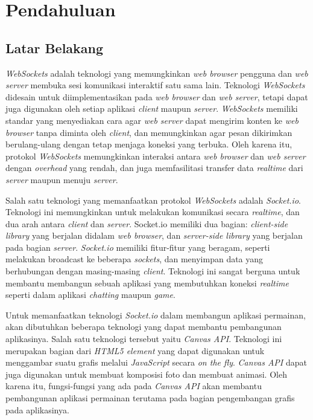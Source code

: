 \chapter{Pendahuluan}
\label{chap:intro}
   
\section{Latar Belakang}
\label{sec:label}

\textit{WebSockets} adalah teknologi yang memungkinkan \textit{web browser} pengguna dan \textit{web server} membuka sesi komunikasi interaktif satu sama lain. Teknologi \textit{WebSockets}  didesain untuk diimplementasikan pada \textit{web browser} dan \textit{web server}, tetapi dapat juga digunakan oleh setiap aplikasi \textit{client} maupun \textit{server}. \textit{WebSockets} memiliki standar yang menyediakan cara agar \textit{web server} dapat mengirim konten ke \textit{web browser} tanpa diminta oleh \textit{client}, dan memungkinkan agar pesan dikirimkan berulang-ulang dengan tetap menjaga koneksi yang terbuka. Oleh karena itu, protokol \textit{WebSockets} memungkinkan interaksi antara \textit{web browser} dan \textit{web server} dengan \textit{overhead} yang rendah, dan juga memfasilitasi transfer data \textit{realtime} dari \textit{server} maupun menuju \textit{server}.

Salah satu teknologi yang memanfaatkan protokol \textit{WebSockets} adalah \textit{Socket.io}. Teknologi ini memungkinkan untuk melakukan komunikasi secara \textit{realtime}, dan dua arah antara \textit{client} dan \textit{server}. Socket.io memiliki dua bagian: \textit{client-side library} yang berjalan didalam \textit{web browser}, dan \textit{server-side library} yang berjalan pada bagian \textit{server}. \textit{Socket.io} memiliki fitur-fitur yang beragam, seperti melakukan broadcast ke beberapa \textit{sockets}, dan menyimpan data yang berhubungan dengan masing-masing \textit{client}. Teknologi ini sangat berguna untuk membantu membangun sebuah aplikasi yang membutuhkan koneksi \textit{realtime} seperti dalam aplikasi \textit{chatting} maupun \textit{game}.

Untuk memanfaatkan teknologi \textit{Socket.io} dalam membangun aplikasi permainan, akan dibutuhkan beberapa teknologi yang dapat membantu pembangunan aplikasinya. Salah satu teknologi tersebut yaitu \textit{Canvas API}. Teknologi ini merupakan bagian dari \textit{HTML5 element} yang dapat digunakan untuk menggambar suatu grafis melalui \textit{JavaScript} secara \textit{on the fly}. \textit{Canvas API} dapat juga digunakan untuk membuat komposisi foto dan membuat animasi. Oleh karena itu, fungsi-fungsi yang ada pada \textit{Canvas API} akan membantu pembangunan aplikasi permainan terutama pada bagian pengembangan grafis pada aplikasinya.

